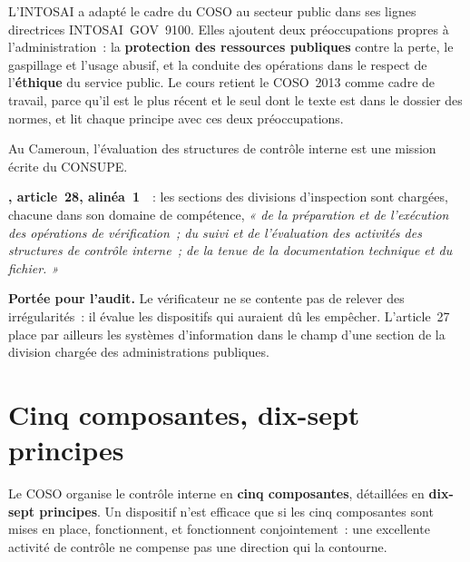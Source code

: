 L'INTOSAI a adapté le cadre du COSO au secteur public dans ses lignes
directrices INTOSAI~GOV~9100. Elles ajoutent deux préoccupations propres à
l'administration~: la \textbf{protection des ressources publiques} contre
la perte, le gaspillage et l'usage abusif, et la conduite des opérations
dans le respect de l'\textbf{éthique} du service public. Le cours retient
le COSO~2013 comme cadre de travail, parce qu'il est le plus récent et le
seul dont le texte est dans le dossier des normes, et lit chaque principe
avec ces deux préoccupations.

Au Cameroun, l'évaluation des structures de contrôle interne est une
mission écrite du CONSUPE.

\begin{boxjuris}
\textbf{, article~28, alinéa~1}~\cite{decret2013287consupe}~:
les sections des divisions d'inspection sont chargées, chacune dans son
domaine de compétence, \textit{« de la préparation et de l'exécution des
opérations de vérification~; du suivi et de l'évaluation des activités
des structures de contrôle interne~; de la tenue de la documentation
technique et du fichier. »}

\medskip
\textbf{Portée pour l'audit.} Le vérificateur ne se contente pas de
relever des irrégularités~: il évalue les dispositifs qui auraient dû les
empêcher. L'article~27 place par ailleurs les systèmes d'information dans
le champ d'une section de la division chargée des administrations
publiques.
\end{boxjuris}

\separateur

\section{Cinq composantes, dix-sept principes}
\label{sec:c02-coso}

Le COSO organise le contrôle interne en \textbf{cinq composantes},
détaillées en \textbf{dix-sept principes}. Un dispositif n'est efficace
que si les cinq composantes sont mises en place, fonctionnent, et
fonctionnent conjointement~: une excellente activité de contrôle ne
compense pas une direction qui la contourne.

